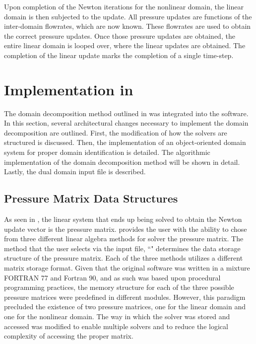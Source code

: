 Upon completion of the Newton iterations for the nonlinear domain, the linear domain is then subjected to the update.
All pressure updates are functions of the inter-domain flowrates, which are now known.
These flowrates are used to obtain the correct pressure updates.
Once those pressure updates are obtained, the entire linear domain is looped over, where the linear updates are obtained.
The completion of the linear update marks the completion of a single time-step.

\section{Implementation in \cobra{}}
\label{sec:dd_algo}

The domain decomposition method outlined in  was integrated into the \cobra{} software.
In this section, several architectural changes necessary to implement the domain decomposition are outlined.
First, the modification of how the solvers are structured is discussed.
Then, the implementation of an object-oriented domain system for proper domain identification is detailed.
The algorithmic implementation of the domain decomposition method will be shown in detail.
Lastly, the dual domain input file is described.

\subsection{Pressure Matrix Data Structures}
\label{subsect:domDecompSolverStructs}

As seen in , the linear system that ends up being solved to obtain the Newton update vector is the pressure matrix.
\cobra{} provides the user with the ability to chose from three different linear algebra methods for solver the pressure matrix.
The method that the user selects via the \cobra{} input file, ``" determines the data storage structure of the pressure matrix.
Each of the three methods utilizes a different matrix storage format.
Given that the original software was written in a mixture FORTRAN 77 and Fortran 90, and as such was based upon procedural programming practices, the memory structure for each of the three possible pressure matrices were predefined in different modules.
However, this paradigm precluded the existence of two pressure matrices, one for the linear domain and one for the nonlinear domain.
The way in which the solver was stored and accessed was modified to enable multiple solvers and to reduce the logical complexity of accessing the proper matrix.

